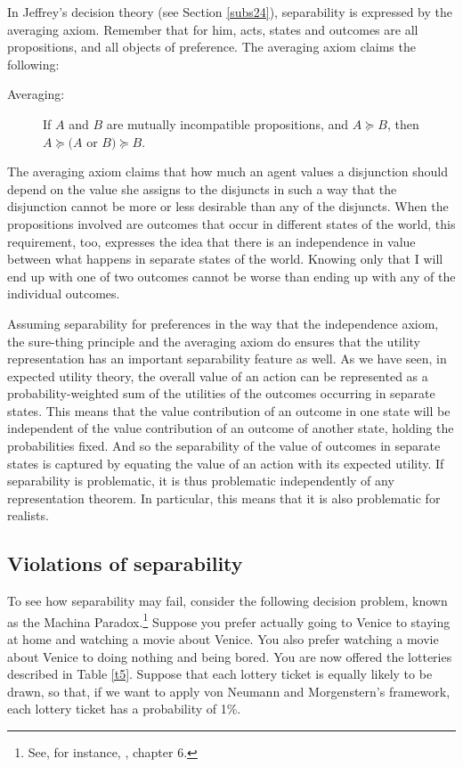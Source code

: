 In Jeffrey's decision theory (see Section \ref{subs24}), separability is expressed by the averaging axiom. Remember that for him, acts, states and outcomes are all propositions, and all objects of preference. The averaging axiom claims the following:
\begin{description}
\item[Averaging:] If $A$ and $B$ are mutually incompatible propositions, and $A \succcurlyeq B$, then $A \succcurlyeq (A$ or $B) \succcurlyeq B$.
\end{description}
The averaging axiom claims that how much an agent values a disjunction should depend on the value she assigns to the disjuncts in such a way that the disjunction cannot be more or less desirable than any of the disjuncts. When the propositions involved are outcomes that occur in different states of the world, this requirement, too, expresses the idea that there is an independence in value between what happens in separate states of the world. Knowing only that I will end up with one of two outcomes cannot be worse than ending up with any of the individual outcomes.

Assuming separability for preferences in the way that the independence axiom, the sure-thing principle and the averaging axiom do ensures that the utility representation has an important separability feature as well. As we have seen, in expected utility theory, the overall value of an action can be represented as a probability-weighted sum of the utilities of the outcomes occurring in separate states. This means that the value contribution of an outcome in one state will be independent of the value contribution of an outcome of another state, holding the probabilities fixed. And so the separability of the value of outcomes in separate states is captured by equating the value of an action with its expected utility. If separability is problematic, it is thus problematic independently of any representation theorem. In particular, this means that it is also problematic for realists.

\subsection{Violations of separability}\label{subs52}

To see how separability may fail, consider the following decision problem, known as the Machina Paradox.\footnote{See, for instance, \citet{Mas-Colell1995}, chapter 6.} Suppose you prefer actually going to Venice to staying at home and watching a movie about Venice. You also prefer watching a movie about Venice to doing nothing and being bored. You are now offered the lotteries described in Table \ref{t5}. Suppose that each lottery ticket is equally likely to be drawn, so that, if we want to apply von Neumann and Morgenstern's framework, each lottery ticket has a probability of 1\%.

